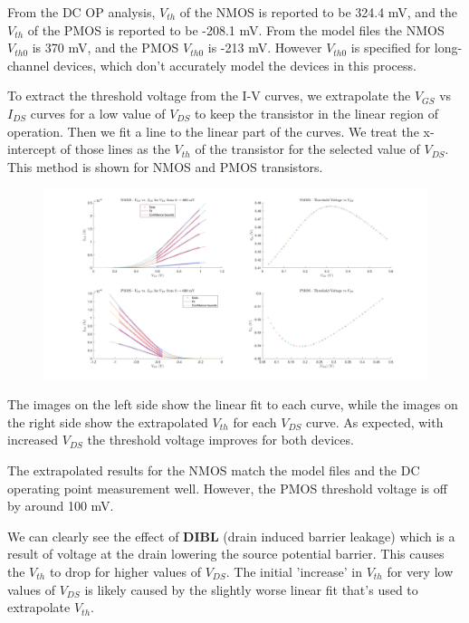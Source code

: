\documentclass[11pt]{article}
\begin{document}
From the DC OP analysis, $V_{th}$ of the NMOS is reported to be 324.4 mV, and the $V_{th}$ of the PMOS is reported to be -208.1 mV. From the model files the NMOS $V_{th0}$ is 370 mV, and the PMOS $V_{th0}$ is -213 mV. However $V_{th0}$ is specified for long-channel devices, which don't accurately model the devices in this process.

To extract the threshold voltage from the I-V curves, we extrapolate the $V_{GS}$ vs $I_{DS}$ curves for a low value of $V_{DS}$ to keep the transistor in the linear region of operation. Then we fit a line to the linear part of the curves. We treat the x-intercept of those lines as the $V_{th}$ of the transistor for the selected value of $V_{DS}$. This method is shown for NMOS and PMOS transistors.

\begin{figure}[H]
	\centerline{\includegraphics[width=\textwidth+5cm]{images/threshold_voltage.png}}	
\end{figure}

The images on the left side show the linear fit to each curve, while the images on the right side show the extrapolated $V_{th}$ for each $V_{DS}$ curve. As expected, with increased $V_{DS}$ the threshold voltage improves for both devices. 

The extrapolated results for the NMOS match the model files and the DC operating point measurement well. However, the PMOS threshold voltage is off by around 100 mV.

We can clearly see the effect of \textbf{DIBL} (drain induced barrier leakage) which is a result of voltage at the drain lowering the source potential barrier. This causes the $V_{th}$ to drop for higher values of $V_{DS}$. The initial 'increase' in $V_{th}$ for very low values of $V_{DS}$ is likely caused by the slightly worse linear fit that's used to extrapolate $V_{th}$.
\end{document}

